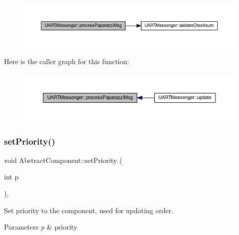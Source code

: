 \begin{figure}[H]
\begin{center}
\leavevmode
\includegraphics[width=350pt]{class_u_a_r_t_messenger_a3ae1cd91810b34f89244cd157c436c3c_cgraph}
\end{center}
\end{figure}
Here is the caller graph for this function\+:\nopagebreak
\begin{figure}[H]
\begin{center}
\leavevmode
\includegraphics[width=350pt]{class_u_a_r_t_messenger_a3ae1cd91810b34f89244cd157c436c3c_icgraph}
\end{center}
\end{figure}
\mbox{\label{class_abstract_component_a58a59a9ea6c3b4c86fb3bf98ff1eaaef}} 
\subsubsection{\texorpdfstring{set\+Priority()}{setPriority()}}
{\footnotesize\ttfamily void Abstract\+Component\+::set\+Priority (\begin{DoxyParamCaption}\item[{int}]{p }\end{DoxyParamCaption})\hspace{0.3cm}{\ttfamily [inline]}, {\ttfamily [inherited]}}



Set priority to the component, used for updating order. 


\begin{DoxyParams}{Parameters}
{\em p} & priority \\
\hline
\end{DoxyParams}


